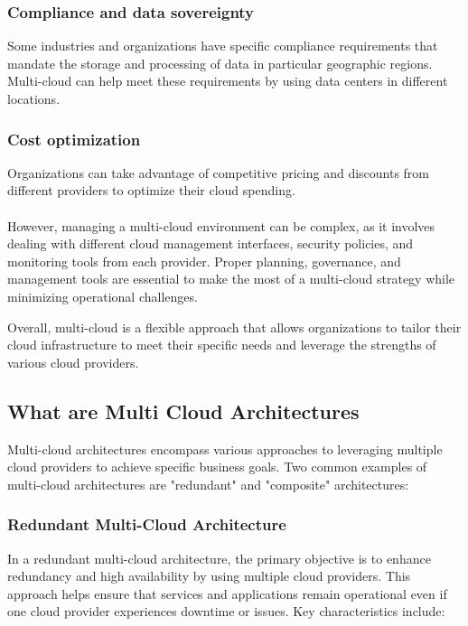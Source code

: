 \subsubsection{Compliance and data sovereignty}
Some industries and organizations have specific compliance requirements that mandate the storage and processing of 
data in particular geographic regions. Multi-cloud can help meet these requirements by using data centers in different locations.

\subsubsection{Cost optimization}
Organizations can take advantage of competitive pricing and 
discounts from different providers to optimize their cloud spending.\\
\\

However, managing a multi-cloud environment can be complex, as it involves dealing with different cloud management
interfaces, security policies, and monitoring tools from each provider. Proper planning, governance, and management tools are 
essential to make the most of a multi-cloud strategy while minimizing operational challenges.

Overall, multi-cloud is a flexible approach that allows organizations to tailor their cloud infrastructure to meet 
their specific needs and leverage the strengths of various cloud providers.

\subsection{What are Multi Cloud Architectures}


Multi-cloud architectures encompass various approaches to leveraging multiple cloud providers to achieve specific business goals. 
Two common examples of multi-cloud architectures are "redundant" and "composite" architectures:

\subsubsection{Redundant Multi-Cloud Architecture}

In a redundant multi-cloud architecture, the primary objective is to enhance redundancy and high availability by using multiple cloud providers. 
This approach helps ensure that services and applications remain operational even if one cloud provider experiences downtime or issues. 
Key characteristics include:

